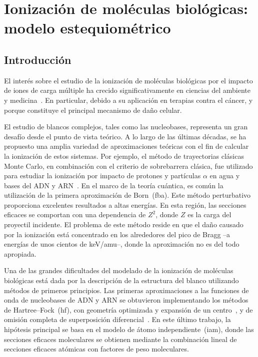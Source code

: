 \chapter{Ionización de moléculas biológicas: modelo estequiométrico}
\label{chap:ionmol}

\section{Introducción}

El interés sobre el estudio de la ionización de moléculas biológicas por 
el impacto de iones de carga múltiple ha crecido significativamente en
ciencias del ambiente~\cite{Gafur:18,FerrazDias:13} y 
medicina~\cite{Baskar:12,Solov:09}. En particular, debido a su 
aplicación en terapias contra el cáncer, y porque constituye el 
principal mecanismo de daño celular.

El estudio de blancos complejos, tales como las nucleobases, representa 
un gran desafío desde el punto de vista teórico. A lo largo de las 
últimas décadas, se ha propuesto una amplia variedad de aproximaciones 
teóricas con el fin de calcular la ionización de estos sistemas. Por 
ejemplo, el método de trayectorias clásicas 
Monte Carlo, en combinación con el criterio de sobrebarrera clásica, fue 
utilizado para estudiar la ionización por impacto de protones y 
partículas $\alpha$ en agua y bases del ADN y 
ARN~\cite{Abbas:08,Lekadir:09}. En el marco de la teoría cuántica, 
es común la utilización de la primera aproximación de Born~(\acs{fba}). 
Este método perturbativo proporciona excelentes resultados a altas 
energías. En esta región, las secciones eficaces se comportan con una 
dependencia de $Z^2$, donde $Z$ es la carga del proyectil incidente. El
problema de este método reside en que el daño causado por la ionización 
está concentrado en los alrededores del pico de Bragg --a energías de 
unos cientos de keV/amu--, donde la aproximación no es del todo 
apropiada. 

Una de las grandes dificultades del modelado de la ionización de 
moléculas biológicas está dada por la descripción de la estructura del 
blanco utilizando métodos de primeros principios. Las primeras 
aproximaciones a las funciones de onda de nucleobases de ADN y ARN se 
obtuvieron implementando los métodos de Hartree--Fock~(\acs{hf}), con 
geometría optimizada y expansión de un centro~\cite{DalCappello:08}, y 
de omisión completa de superposición diferencial~\cite{Champion:10}. En 
este último trabajo, la hipótesis principal se basa en el modelo de 
átomo independiente~(\acs{iam}), donde las secciones eficaces 
moleculares se obtienen mediante la combinación lineal de secciones 
eficaces atómicas con factores de peso moleculares. 

